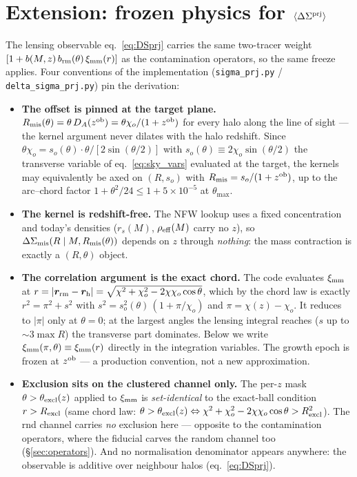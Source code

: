 \documentclass[a4paper, 11pt]{article}
\newcommand{\zob}{z^{\rm ob}}
\newcommand{\ximm}{\xi_{\rm mm}}
\newcommand{\avg}[1]{\langle #1 \rangle}
\newcommand{\Rex}{R_{\rm excl}}
\newcommand{\brm}{b_{\rm rm}}
\newcommand{\DSprj}{\Delta\Sigma^{\rm prj}}
\newcommand{\DSmis}{\Delta\Sigma_{\rm mis}}
\newcommand{\Rmis}{R_{\rm mis}}
\begin{document}
\section{Extension: frozen physics for \texorpdfstring{$\avg{\DSprj}$}{DeltaSigma-prj}}
\label{sec:frozen_dsprj}

The lensing observable eq.~\eqref{eq:DSprj} carries the same
two-tracer weight $[1 + b(M,z)\,\brm(\theta)\,\ximm(r)]$ as the
contamination operators, so the same freeze applies. Four
conventions of the implementation
(\texttt{sigma\_prj.py} / \texttt{delta\_sigma\_prj.py}) pin the
derivation:
\begin{itemize}
\item \textbf{The offset is pinned at the target plane.}
      $\Rmis(\theta) = \theta\,D_A(\zob) = \theta\chi_o/(1+\zob)$
      for every halo along the line of sight --- the kernel
      argument never dilates with the halo redshift. Since
      $\theta\chi_o = s_o(\theta)\cdot\theta/[2\sin(\theta/2)]$
      with $s_o(\theta)\equiv2\chi_o\sin(\theta/2)$ the
      transverse variable of eq.~\eqref{eq:sky_vars} evaluated at
      the target, the kernels may equivalently be axed on
      $(R,s_o)$ with $\Rmis = s_o/(1+\zob)$, up to the arc--chord
      factor $1+\theta^2/24 \le 1+5\times10^{-5}$ at
      $\theta_{\max}$.
\item \textbf{The kernel is redshift-free.} The NFW lookup uses a
      fixed concentration and today's densities
      ($r_s(M)$, $\rho_{\rm eff}(M)$ carry no $z$), so
      $\DSmis(R\mid M,\Rmis(\theta))$ depends on $z$ through
      \emph{nothing}: the mass contraction is exactly a
      $(R,\theta)$ object.
\item \textbf{The correlation argument is the exact chord.} The
      code evaluates $\ximm$ at
      $r = |\bm r_{\rm rm}-\bm r_{\rm h}|
      = \sqrt{\chi^2+\chi_o^2-2\chi\chi_o\cos\theta}$, which by
      the chord law is exactly
      $r^2 = \pi^2 + s^2$ with
      $s^2 = s_o^2(\theta)\,(1+\pi/\chi_o)$ and
      $\pi = \chi(z)-\chi_o$. It reduces to $|\pi|$ only at
      $\theta=0$; at the largest angles the lensing integral
      reaches ($s$ up to $\sim3\max R$) the transverse part
      dominates. Below we write
      $\ximm(\pi,\theta)\equiv\ximm(r)$ directly in the
      integration variables. The growth epoch is frozen at
      $\zob$ --- a production convention, not a new
      approximation.
\item \textbf{Exclusion sits on the clustered channel only.} The
      per-$z$ mask $\theta > \theta_{\rm excl}(z)$ applied to
      $\ximm$ is \emph{set-identical} to the exact-ball condition
      $r>\Rex$ (same chord law:
      $\theta>\theta_{\rm excl}(z) \Leftrightarrow
      \chi^2+\chi_o^2-2\chi\chi_o\cos\theta > \Rex^2$). The rnd
      channel carries \emph{no} exclusion here --- opposite to
      the contamination operators, where the fiducial carves the
      random channel too (\S\ref{sec:operators}). And no
      normalisation denominator appears anywhere: the observable
      is additive over neighbour halos (eq.~\ref{eq:DSprj}).
\end{itemize}
\end{document}
